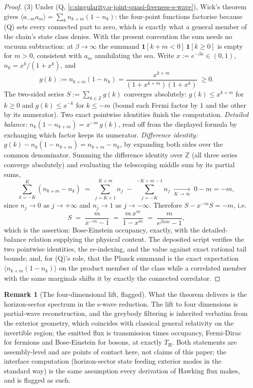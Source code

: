 \documentclass[11pt]{article}
\theoremstyle{definition}
\newtheorem{remark}[theorem]{Remark}
\theoremstyle{plain}
\providecommand{\TH}{}\renewcommand{\TH}{T_{\mathrm{H}}}
\begin{document}
\begin{proof}
(3) Under (Q, \ref{c:singularity.q-joint-quasi-freeness-s-wave}), Wick's theorem gives $\langle a_{-m} a_m\rangle = \sum_{k} n_{k+m}(1 - n_k)$: the four-point functions factorise because (Q) sets every connected part to zero, which is exactly what a general member of the chain's state class denies. With the present convention the sum needs no vacuum subtraction: at $\beta \to \infty$ the summand $\mathbf{1}[k + m < 0]\,\mathbf{1}[k \geq 0]$ is empty for $m > 0$, consistent with $a_m$ annihilating the sea. Write $x := e^{-\beta\kappa} \in (0,1)$, $n_k = x^k/(1 + x^k)$, and
\[
g(k) := n_{k+m}(1 - n_k) = \frac{x^{k+m}}{(1 + x^{k+m})(1 + x^k)} \;\geq 0.
\]
The two-sided series $S := \sum_{k \in \mathbb{Z}} g(k)$ converges absolutely: $g(k) \leq x^{k+m}$ for $k \geq 0$ and $g(k) \leq x^{-k}$ for $k \leq -m$ (bound each Fermi factor by $1$ and the other by its numerator). Two exact pointwise identities finish the computation. \emph{Detailed balance:} $n_k(1 - n_{k+m}) = x^{-m}\, g(k)$, read off from the displayed formula by exchanging which factor keeps its numerator. \emph{Difference identity:} $g(k) - n_k(1 - n_{k+m}) = n_{k+m} - n_k$, by expanding both sides over the common denominator. Summing the difference identity over $\mathbb{Z}$ (all three series converge absolutely) and evaluating the telescoping middle sum by its partial sums,
\[
\sum_{k=-K}^{K} (n_{k+m} - n_k) \;=\; \sum_{j=K+1}^{K+m} n_j \;-\; \sum_{j=-K}^{-K+m-1} n_j \;\xrightarrow[K \to \infty]{}\; 0 - m = -m ,
\]
since $n_j \to 0$ as $j \to +\infty$ and $n_j \to 1$ as $j \to -\infty$. Therefore $S - x^{-m} S = -m$, i.e.
\[
S \;=\; \frac{m}{x^{-m} - 1} \;=\; \frac{m\,x^m}{1 - x^m} \;=\; \frac{m}{e^{\beta\kappa m} - 1} ,
\]
which is the assertion: Bose-Einstein occupancy, exactly, with the detailed-balance relation supplying the physical content. The deposited script verifies the two pointwise identities, the re-indexing, and the value against exact rational tail bounds; and, for (Q)'s role, that the Planck summand is the exact expectation $\langle n_{k+m}(1 - n_k)\rangle$ on the product member of the class while a correlated member with the same marginals shifts it by exactly the connected correlator.

\end{proof}

\begin{remark}[The four-dimensional lift, flagged]\label{c:note.singularity.four-dimensional-lift-flagged}
What the theorem delivers is the horizon-sector spectrum in the s-wave reduction. The lift to four dimensions is partial-wave reconstruction, and the greybody filtering is inherited verbatim from the exterior geometry, which coincides with classical general relativity on the invertible region; the emitted flux is transmission times occupancy, Fermi-Dirac for fermions and Bose-Einstein for bosons, at exactly $\TH$. Both statements are assembly-level and are points of contact here, not claims of this paper; the interface computation (horizon-sector state feeding exterior modes in the standard way) is the same assumption every derivation of Hawking flux makes, and is flagged as such.
\end{remark}
\end{document}
